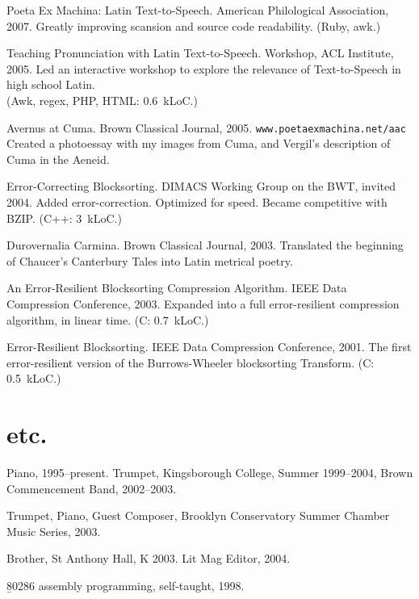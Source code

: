 \documentclass[11pt]{article}
\begin{document}
\p Poeta Ex Machina: Latin Text-to-Speech.  American Philological Association, 2007.
Greatly improving scansion and source code readability.  (Ruby, awk.)



\p Teaching Pronunciation with Latin Text-to-Speech.  Workshop, ACL Institute, 2005.
Led an interactive workshop to explore the relevance of Text-to-Speech in high school Latin.\\(Awk, regex, PHP, HTML: 0.6~kLoC.)

\p Avernus at Cuma.  Brown Classical Journal, 2005.  \texttt{www.poetaexmachina.net/aac}
Created a photoessay with my images from Cuma, and Vergil's description of Cuma in the Aeneid.

\p Error-Correcting Blocksorting.  DIMACS Working Group on the BWT, invited 2004.
Added error-correction.  Optimized for speed.  Became competitive with BZIP.  (C++: 3~kLoC.)

\p Durovernalia Carmina. Brown Classical Journal, 2003.
Translated the beginning of Chaucer's Canterbury Tales into Latin metrical poetry.

\p An Error-Resilient Blocksorting Compression Algorithm.  IEEE Data Compression Conference, 2003.
Expanded into a full error-resilient compression algorithm, in linear time. (C: 0.7~kLoC.)

\p Error-Resilient Blocksorting.  IEEE Data Compression Conference, 2001.
The first error-resilient version of the Burrows-Wheeler blocksorting Transform. (C: 0.5~kLoC.)

\part{etc.}%
\noindent Piano, 1995--present.  %
\noindent Trumpet, Kingsborough College, Summer 1999--2004, Brown Commencement Band, 2002--2003.

\noindent Trumpet, Piano, Guest Composer, Brooklyn Conservatory Summer Chamber Music Series, 2003.

\noindent Brother, St Anthony Hall, K 2003.  Lit Mag Editor, 2004.

\noindent\b{80286 assembly programming, self-taught, 1998.}
\end{document}
